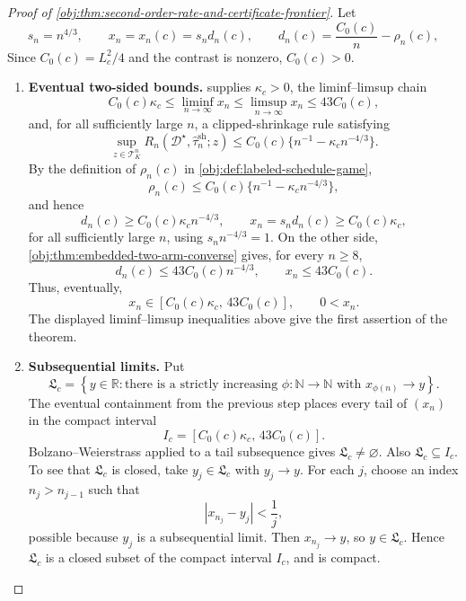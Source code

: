 \documentclass[11pt]{article}
\begin{document}
\begin{proof}[Proof of \cref{obj:thm:second-order-rate-and-certificate-frontier}]
Let
\[
s_n=n^{4/3},
\qquad
x_n=x_n(c)=s_n d_n(c),
\qquad
d_n(c)=\frac{C_0(c)}{n}-\rho_n(c),
\]
Since \(C_0(c)=L_c^2/4\) and the contrast is nonzero, \(C_0(c)>0\).

\begin{enumerate}
\item \textbf{Eventual two-sided bounds.}
 supplies \(\kappa_c>0\), the liminf--limsup chain
\[
C_0(c)\kappa_c
\leq
\liminf_{n\to\infty}x_n
\leq
\limsup_{n\to\infty}x_n
\leq
43C_0(c),
\]
and, for all sufficiently large \(n\), a clipped-shrinkage rule satisfying
\[
\sup_{z\in\mathcal T_K^n}
R_n(\mathcal D^\star,\widehat\tau_n^{\mathrm{sh}};z)
\le
C_0(c)\{n^{-1}-\kappa_c n^{-4/3}\}.
\]
By the definition of \(\rho_n(c)\) in \cref{obj:def:labeled-schedule-game},
\[
\rho_n(c)
\le
C_0(c)\{n^{-1}-\kappa_c n^{-4/3}\},
\]
and hence
\[
d_n(c)\ge C_0(c)\kappa_c n^{-4/3},
\qquad
x_n=s_nd_n(c)\ge C_0(c)\kappa_c ,
\]
for all sufficiently large \(n\), using \(s_n n^{-4/3}=1\). On the other side, \cref{obj:thm:embedded-two-arm-converse} gives, for every \(n\ge8\),
\[
d_n(c)\le 43C_0(c)n^{-4/3},
\qquad
x_n\le 43C_0(c).
\]
Thus, eventually,
\[
x_n\in
\left[C_0(c)\kappa_c,\,43C_0(c)\right],
\qquad
0<x_n.
\]
The displayed liminf--limsup inequalities above give the first assertion of the theorem. %

\item \textbf{Subsequential limits.}
Put
\[
\mathfrak L_c
=
\left\{y\in\mathbb R:
\text{there is a strictly increasing }\phi:\mathbb N\to\mathbb N
\text{ with }x_{\phi(n)}\to y\right\}.
\]
The eventual containment from the previous step places every tail of \((x_n)\) in the compact interval
\[
I_c=\left[C_0(c)\kappa_c,\,43C_0(c)\right].
\]
Bolzano--Weierstrass applied to a tail subsequence gives \(\mathfrak L_c\neq\varnothing\). Also \(\mathfrak L_c\subseteq I_c\). To see that \(\mathfrak L_c\) is closed, take \(y_j\in\mathfrak L_c\) with \(y_j\to y\). For each \(j\), choose an index \(n_j>n_{j-1}\) such that
\[
|x_{n_j}-y_j|<\frac1j,
\]
possible because \(y_j\) is a subsequential limit. Then \(x_{n_j}\to y\), so \(y\in\mathfrak L_c\). Hence \(\mathfrak L_c\) is a closed subset of the compact interval \(I_c\), and is compact. %


\end{enumerate}
\end{proof}
\end{document}
